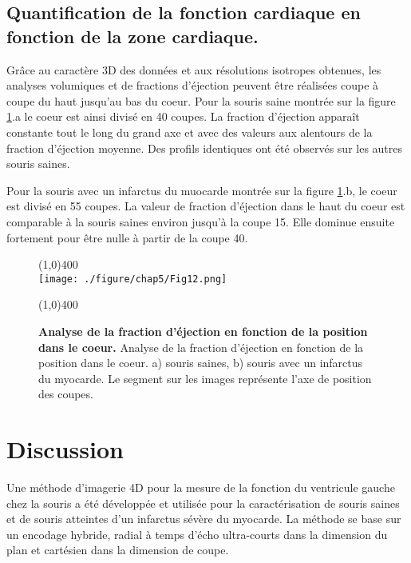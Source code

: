 \subsection{Quantification de la fonction cardiaque en fonction de la zone cardiaque.}

Grâce au caractère 3D des données et aux résolutions isotropes obtenues, les analyses volumiques et de fractions d'éjection peuvent être réalisées coupe à coupe du haut jusqu'au bas du coeur.
Pour la souris saine montrée sur la figure \ref{fig:FractionEjectionCoupe}.a le coeur est ainsi divisé en 40 coupes. La fraction d'éjection apparaît constante tout le long du grand axe et avec des valeurs aux alentours de la fraction d'éjection moyenne. Des profils identiques ont été observés sur les autres souris saines.

Pour la souris avec un infarctus du muocarde montrée sur la figure \ref{fig:FractionEjectionCoupe}.b, le coeur est divisé en 55 coupes. La valeur de fraction d'éjection dans le haut du coeur est comparable à la souris saines environ jusqu'à la coupe 15. Elle dominue ensuite fortement pour être nulle à partir de la coupe 40.

\begin{figure}[H]
\centering
\line(1,0){400} \\
\texttt{[image: ./figure/chap5/Fig12.png]}
\caption[Analyse de la fraction d'éjection en fonction de la position dans le coeur.]{\label{fig:FractionEjectionCoupe} \textbf{Analyse de la fraction d'éjection en fonction de la position dans le coeur.} Analyse de la fraction d’éjection en fonction de la position dans le coeur. a) souris saines, b) souris avec un infarctus du myocarde. Le segment sur les images représente l’axe de position des coupes.}
\line(1,0){400} \\ 
\end{figure}

\section{Discussion}


Une méthode d’imagerie 4D pour la mesure de la fonction du ventricule gauche chez la souris a été développée et utilisée pour la caractérisation de souris saines et de souris atteintes d’un infarctus sévère du myocarde.
La méthode se base sur un encodage hybride, radial à temps d’écho ultra-courts dans la dimension du plan et cartésien dans la dimension de coupe. 

